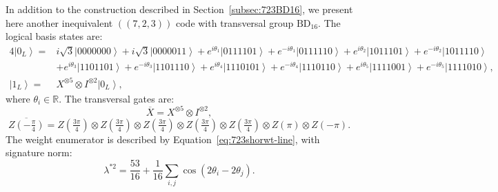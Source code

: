 \documentclass[8pt]{article}
\theoremstyle{definition}
\begin{document}
In addition to the construction described in Section~\ref{subsec:723BD16}, we present here another inequivalent \(((7,2,3))\) code with transversal group \(\mathrm{BD}_{16}\). The logical basis states are:
\begin{align*}
    4\left|0_{L}\right\rangle = & i\sqrt{3}\left|0000000\right\rangle +i\sqrt{3}\left|0000011\right\rangle +e^{i\theta_{1}}\left|0111101\right\rangle +e^{-i\theta_{1}}\left|0111110\right\rangle +e^{i\theta_{2}}\left|1011101\right\rangle +e^{-i\theta_{2}}\left|1011110\right\rangle                 \\
                                & +e^{i\theta_{3}}\left|1101101\right\rangle +e^{-i\theta_{3}}\left|1101110\right\rangle +e^{i\theta_{4}}\left|1110101\right\rangle +e^{-i\theta_{4}}\left|1110110\right\rangle +e^{i\theta_{5}}\left|1111001\right\rangle +e^{-i\theta_{5}}\left|1111010\right\rangle , \\
    \left|1_{L}\right\rangle =  & X^{\otimes 5} \otimes I^{\otimes 2}\left|0_{L}\right\rangle,
\end{align*}
where $\theta_i\in\mathbb{R}$. The transversal gates are:
\[ \overline{X}=X^{\otimes 5} \otimes I^{\otimes 2}, \]
\[ \overline{Z\left(-\tfrac{\pi}{4}\right)}=Z\left(\tfrac{3\pi}{4}\right)\otimes Z\left(\tfrac{3\pi}{4}\right)\otimes Z\left(\tfrac{3\pi}{4}\right)\otimes Z\left(\tfrac{3\pi}{4}\right)\otimes Z\left(\tfrac{3\pi}{4}\right)\otimes Z\left(\pi\right)\otimes Z\left(-\pi\right). \]
The weight enumerator is described by Equation~\eqref{eq:723shorwt-line}, with signature norm:
\[ \lambda^{*2}=\frac{53}{16}+\frac{1}{16}\sum_{i,j}\cos\left(2\theta_{i}-2\theta_{j}\right). \]
\end{document}
